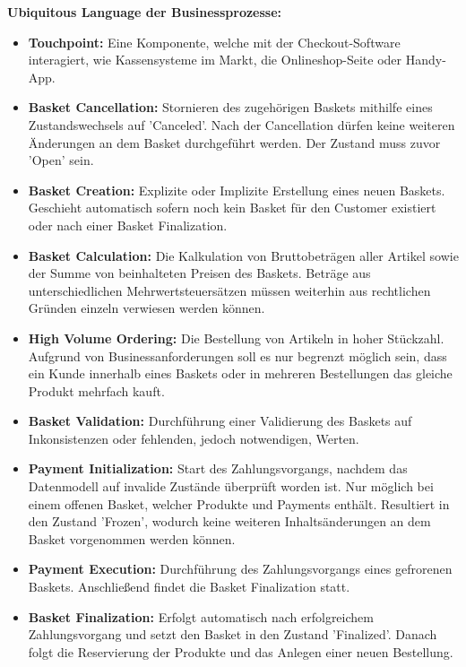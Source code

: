\pagebreak

{\large \textbf{Ubiquitous Language der Businessprozesse:}}
\begin{itemize}[topsep=-3px]
	\item \textbf{Touchpoint: } { Eine Komponente, welche mit der Checkout-Software interagiert, wie Kassensysteme im Markt, die Onlineshop-Seite oder Handy-App.}
	\item \textbf{Basket Cancellation: } {Stornieren des zugehörigen Baskets mithilfe eines Zustandswechsels auf 'Canceled'. Nach der Cancellation dürfen keine weiteren Änderungen an dem Basket durchgeführt werden. Der Zustand muss zuvor 'Open' sein. }
	\item \textbf{Basket Creation: } {Explizite oder Implizite Erstellung eines neuen Baskets. Geschieht automatisch sofern noch kein Basket für den Customer existiert oder nach einer Basket Finalization.}
	\item \textbf{Basket Calculation: } {Die Kalkulation von Bruttobeträgen aller Artikel sowie der Summe von beinhalteten Preisen des Baskets. Beträge aus unterschiedlichen Mehrwertsteuersätzen müssen weiterhin aus rechtlichen Gründen einzeln verwiesen werden können.}
	\item \textbf{High Volume Ordering: } {Die Bestellung von Artikeln in hoher Stückzahl. Aufgrund von Businessanforderungen soll es nur begrenzt möglich sein, dass ein Kunde innerhalb eines Baskets oder in mehreren Bestellungen das gleiche Produkt mehrfach kauft.}
	\item \textbf{Basket Validation: } {Durchführung einer Validierung des Baskets auf Inkonsistenzen oder fehlenden, jedoch notwendigen, Werten.}
	\item \textbf{Payment Initialization: } {Start des Zahlungsvorgangs, nachdem das Datenmodell auf invalide Zustände überprüft worden ist. Nur möglich bei einem offenen Basket, welcher Produkte und Payments enthält. Resultiert in den Zustand 'Frozen', wodurch keine weiteren Inhaltsänderungen an dem Basket vorgenommen werden können.}
	\item \textbf{Payment Execution: } {Durchführung des Zahlungsvorgangs eines gefrorenen Baskets. Anschließend findet die Basket Finalization statt.}
	\item \textbf{Basket Finalization: } {Erfolgt automatisch nach erfolgreichem Zahlungsvorgang und setzt den Basket in den Zustand 'Finalized'. Danach folgt die Reservierung der Produkte und das Anlegen einer neuen Bestellung.}
\end{itemize}
\vspace{2em}

